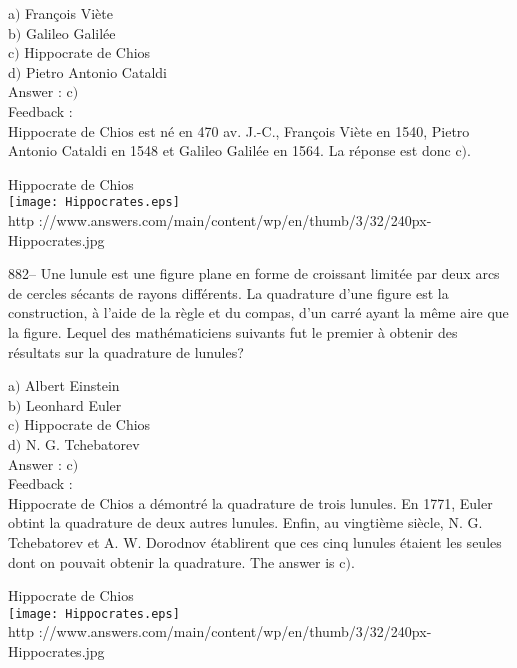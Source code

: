 \documentclass[letterpaper, 12pt]{article}
\begin{document}
a$)$ Fran\c cois Vi\`ete \\
b$)$ Galileo Galil\'ee \\
c$)$ Hippocrate de Chios \\
d$)$ Pietro Antonio Cataldi\\

Answer : c$)$\\

Feedback : \\
Hippocrate de Chios est n\'e en 470 av. J.-C., Fran\c cois Vi\`ete
en 1540,
Pietro Antonio Cataldi en 1548 et Galileo Galil\'ee en 1564. La r\'eponse
est donc c$)$.\\

        \begin{center}
        Hippocrate de Chios\\
    \texttt{[image: Hippocrates.eps]}\\
        {\footnotesize http
://www.answers.com/main/content/wp/en/thumb/3/32/240px-Hippocrates.jpg}
    \end{center}

882-- Une lunule est une figure plane en forme de croissant
limit\'ee par deux arcs de cercles s\'ecants de rayons diff\'erents.
La quadrature d'une figure est la construction, \`a l'aide de la
r\`egle et du compas, d'un carr\'e ayant la m\^eme aire que la
figure. Lequel des math\'ematiciens suivants fut le premier \`a
obtenir des r\'esultats sur la quadrature de lunules?

a$)$ Albert Einstein \\
b$)$ Leonhard Euler \\
c$)$ Hippocrate de Chios \\
d$)$ N. G. Tchebatorev \\

Answer : c$)$\\

Feedback : \\
Hippocrate de Chios a d\'emontr\'e la quadrature de trois lunules. En 1771,
Euler obtint la quadrature de deux autres lunules. Enfin, au vingti\`eme
si\`ecle, N. G. Tchebatorev et
A. W. Dorodnov \'etablirent que ces cinq lunules \'etaient les seules dont
on pouvait obtenir la quadrature. The answer is c$)$.\\

        \begin{center}
        Hippocrate de Chios\\
    \texttt{[image: Hippocrates.eps]}\\
        {\footnotesize http
://www.answers.com/main/content/wp/en/thumb/3/32/240px-Hippocrates.jpg}
    \end{center}
\end{document}
